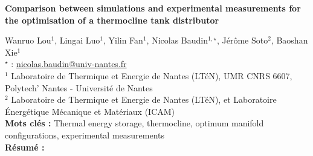 


    \newpage

\BgThispage

%
\begin{flushleft}
\addtocounter{section}{1}
{\Large \textbf{Comparison between simulations and experimental measurements for the optimisation of a thermocline tank distributor}}\label{ref:54}
\end{flushleft}
%
Wanruo Lou$^{1}$, Lingai Luo$^{1}$, Yilin Fan$^{1}$, Nicolas Baudin$^{1,\star}$, Jérôme Soto$^{2}$, Baoshan Xie$^{1}$\\[2mm]
$^{\star}$ \Letter : \url{nicolas.baudin@univ-nantes.fr}\\[2mm]
{\footnotesize $^{1}$ Laboratoire de Thermique et Energie de Nantes (LTéN), UMR CNRS 6607, Polytech' Nantes - Université de Nantes}\\
{\footnotesize $^{2}$ Laboratoire de Thermique et Energie de Nantes (LTéN), et Laboratoire Énergétique Mécanique et Matériaux (ICAM)}\\
[4mm]
%
\noindent \textbf{Mots clés : } Thermal energy storage, thermocline, optimum manifold configurations, experimental measurements\\[4mm]
%
\noindent \textbf{Résumé : } 

